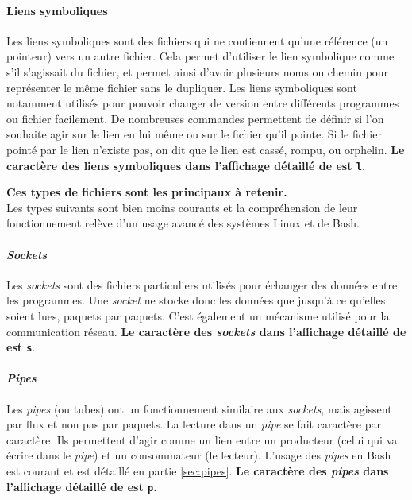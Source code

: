 \paragraph{Liens symboliques} \label{sec:file_links}
Les liens symboliques sont des fichiers qui ne contiennent qu'une référence (un pointeur) vers un autre fichier. Cela permet d'utiliser le lien symbolique comme s'il s'agissait du fichier, et permet ainsi d'avoir plusieurs noms ou chemin pour représenter le même fichier sans le dupliquer. Les liens symboliques sont notamment utilisés pour pouvoir changer de version entre différents programmes ou fichier facilement. De nombreuses commandes permettent de définir si l'on souhaite agir sur le lien en lui même ou sur le fichier qu'il pointe. Si le fichier pointé par le lien n'existe pas, on dit que le lien est cassé, rompu, ou orphelin. \newline
\textbf{Le caractère des liens symboliques dans l'affichage détaillé de  est \texttt{l}}.

\begin{center}
\textbf{Ces types de fichiers sont les principaux à retenir.} \\
Les types suivants sont bien moins courants et la compréhension de leur fonctionnement relève d'un usage avancé des systèmes Linux et de Bash.
\end{center}

\newpage

\paragraph{\textit{Sockets}} \label{sec:file_sockets}
Les \textit{sockets} sont des fichiers particuliers utilisés pour échanger des données entre les programmes. Une \textit{socket} ne stocke donc les données que jusqu'à ce qu'elles soient lues, paquets par paquets. C'est également un mécanisme utilisé pour la communication réseau. \newline \textbf{Le caractère des \textit{sockets} dans l'affichage détaillé de  est \texttt{s}}.

\paragraph{\textit{Pipes}} \label{sec:file_pipes}
Les \textit{pipes} (ou tubes) ont un fonctionnement similaire aux \textit{sockets}, mais agissent par flux et non pas par paquets. La lecture dans un \textit{pipe} se fait caractère par caractère. Ils permettent d'agir comme un lien entre un producteur (celui qui va écrire dans le \textit{pipe}) et un consommateur (le lecteur). L'usage des \textit{pipes} en Bash est courant et est détaillé en partie \ref{sec:pipes}. \newline
\textbf{Le caractère des \textit{pipes} dans l'affichage détaillé de  est \texttt{p}.}

